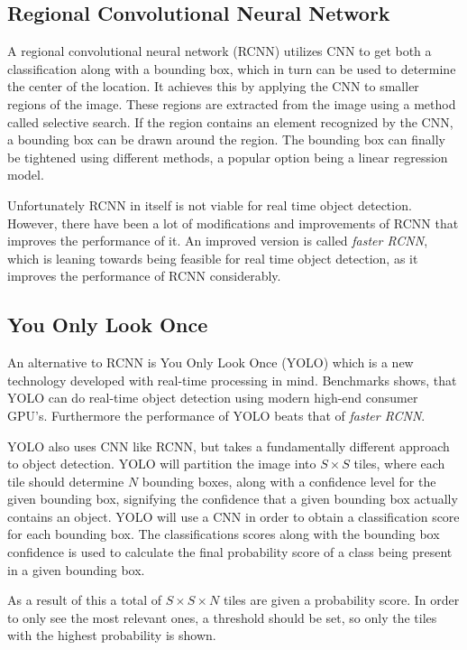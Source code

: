 \subsection{Regional Convolutional Neural Network}
A regional convolutional neural network (RCNN) utilizes CNN to get both a classification along with a bounding box, which in turn can be used to determine the center of the location.
It achieves this by applying the CNN to smaller regions of the image. 
These regions are extracted from the image using a method called selective search.
If the region contains an element recognized by the CNN, a bounding box can be drawn around the region.
The bounding box can finally be tightened using different methods, a popular option being a linear regression model\cite{CNNHistory}.

Unfortunately RCNN in itself is not viable for real time object detection.
However, there have been a lot of modifications and improvements of RCNN that improves the performance of it.
An improved version is called \textit{faster RCNN}, which is leaning towards being feasible for real time object detection, as it improves the performance of RCNN considerably\cite{fasterRCNN}.

\subsection{You Only Look Once}\label{sec:YOLOAnalysis}
An alternative to RCNN is You Only Look Once (YOLO) which is a new technology developed with real-time processing in mind.
Benchmarks shows, that YOLO can do real-time object detection using modern high-end consumer GPU's.
Furthermore the performance of YOLO beats that of \textit{faster RCNN}\cite{odDetection}.

YOLO also uses CNN like RCNN, but takes a fundamentally different approach to object detection.
YOLO will partition the image into $S\times S$ tiles, where each tile should determine $N$ bounding boxes, along with a confidence level for the given bounding box, signifying the confidence that a given bounding box actually contains an object.
YOLO will use a CNN in order to obtain a classification score for each bounding box.
The classifications scores along with the bounding box confidence is used to calculate the final probability score of a class being present in a given bounding box.\cite{odDetection}

As a result of this a total of $S\times S\times N$ tiles are given a probability score.
In order to only see the most relevant ones, a threshold should be set, so only the tiles with the highest probability is shown.

